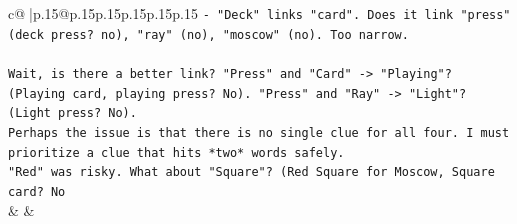 \documentclass{article}
\begin{document}
{\begin{supertabular}{c@{$\;$}|p{.15\linewidth}@{}p{.15\linewidth}p{.15\linewidth}p{.15\linewidth}p{.15\linewidth}p{.15\linewidth}}
{{{\texttt{{-}   "Deck" links "card". Does it link "press" (deck press? no), "ray" (no), "moscow" (no). Too narrow.} \\
\\ 
\texttt{Wait, is there a better link? "Press" and "Card" {-}> "Playing"? (Playing card, playing press? No). "Press" and "Ray" {-}> "Light"? (Light press? No).} \\
\texttt{Perhaps the issue is that there is no single clue for all four. I must prioritize a clue that hits *two* words safely.} \\
\texttt{"Red" was risky. What about "Square"? (Red Square for Moscow, Square card? No} \\
            }
        }
    }
    & & \\ \\

\end{supertabular}
}
\end{document}
